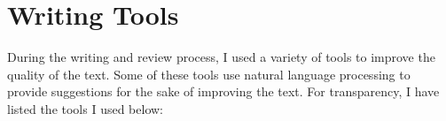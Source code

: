 \chapter*{Writing Tools}

During the writing and review process, I used a variety of tools to improve the quality of the text. Some of these tools use natural language processing to provide suggestions for the sake of improving the text. For transparency, I have listed the tools I used below:

